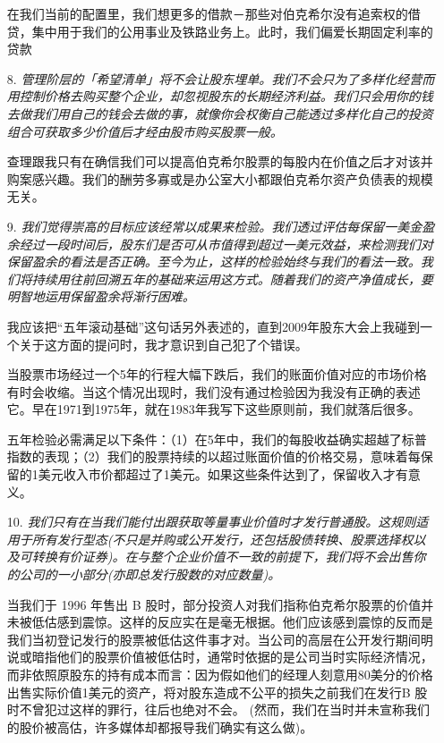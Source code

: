 \documentclass[UTF8,a4paper,zihao=-4,fontset = windows]{ctexart} %
\begin{document}
\begin{itemize}
    在我们当前的配置里，我们想更多的借款－那些对伯克希尔没有追索权的借贷，集中用于我们的公用事业及铁路业务上。此时，我们偏爱长期固定利率的贷款

    \item [8.]
    \textit{管理阶层的「希望清单」将不会让股东埋单。我们不会只为了多样化经营而用控制价格去购买整个企业，却忽视股东的长期经济利益。我们只会用你的钱去做我们用自己的钱会去做的事，就像你会权衡自己能透过多样化自己的投资组合可获取多少价值后才经由股市购买股票一般。}
    
    查理跟我只有在确信我们可以提高伯克希尔股票的每股内在价值之后才对该并购案感兴趣。我们的酬劳多寡或是办公室大小都跟伯克希尔资产负债表的规模无关。

    \item [9.]
    \textit{我们觉得崇高的目标应该经常以成果来检验。我们透过评估每保留一美金盈余经过一段时间后，股东们是否可从市值得到超过一美元效益，来检测我们对保留盈余的看法是否正确。至今为止，这样的检验始终与我们的看法一致。我们将持续用往前回溯五年的基础来运用这方式。随着我们的资产净值成长，要明智地运用保留盈余将渐行困难。}

    我应该把“五年滚动基础”这句话另外表述的，直到2009年股东大会上我碰到一个关于这方面的提问时，我才意识到自己犯了个错误。
    
    当股票市场经过一个5年的行程大幅下跌后，我们的账面价值对应的市场价格有时会收缩。当这个情况出现时，我们没有通过检验因为我没有正确的表述它。早在1971到1975年，就在1983年我写下这些原则前，我们就落后很多。
    
    五年检验必需满足以下条件：（1）在5年中，我们的每股收益确实超越了标普指数的表现；（2）我们的股票持续的以超过账面价值的价格交易，意味着每保留的1美元收入市价都超过了1美元。如果这些条件达到了，保留收入才有意义。

    \item [10.]
    \textit{我们只有在当我们能付出跟获取等量事业价值时才发行普通股。这规则适用于所有发行型态(不只是并购或公开发行，还包括股债转换、股票选择权以及可转换有价证券)。在与整个企业价值不一致的前提下，我们将不会出售你的公司的一小部分(亦即总发行股数的对应数量)。}

    当我们于 1996 年售出 B 股时，部分投资人对我们指称伯克希尔股票的价值并未被低估感到震惊。这样的反应实在是毫无根据。他们应该感到震惊的反而是我们当初登记发行的股票被低估这件事才对。当公司的高层在公开发行期间明说或暗指他们的股票价值被低估时，通常时依据的是公司当时实际经济情况，而非依照原股东的持有成本而言：因为假如他们的经理人刻意用80美分的价格出售实际价值1美元的资产，将对股东造成不公平的损失之前我们在发行B 股时不曾犯过这样的罪行，往后也绝对不会。 (然而，我们在当时并未宣称我们的股价被高估，许多媒体却都报导我们确实有这么做)。


\end{itemize}
\end{document}
